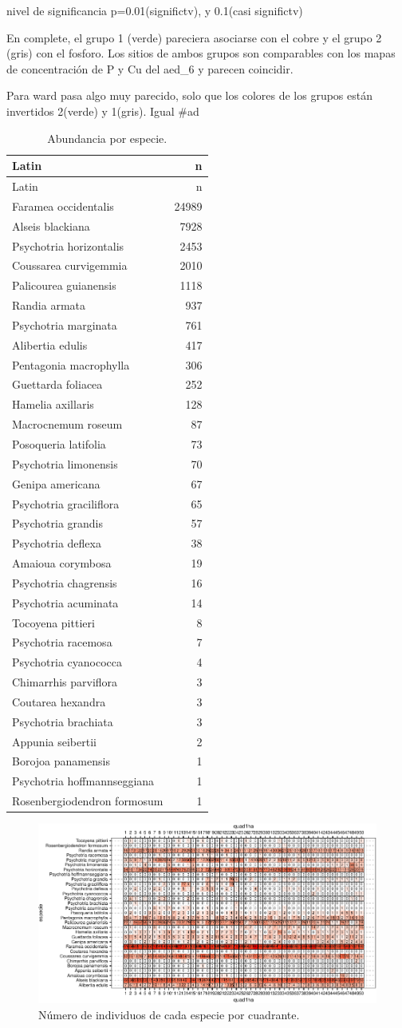 \documentclass[11pt,]{article}
\begin{document}
nivel de significancia p=0.01(significtv), y 0.1(casi significtv)

En complete, el grupo 1 (verde) pareciera asociarse con el cobre y el
grupo 2 (gris) con el fosforo. Los sitios de ambos grupos son
comparables con los mapas de concentración de P y Cu del aed\_6 y
parecen coincidir.

Para ward pasa algo muy parecido, solo que los colores de los grupos
están invertidos 2(verde) y 1(gris). Igual \#ad

\begin{longtable}[]{@{}lr@{}}
\caption{\label{tab:abun_sp}Abundancia por especie.}\tabularnewline
\toprule
Latin & n\tabularnewline
\midrule
\endfirsthead
\toprule
Latin & n\tabularnewline
\midrule
\endhead
Faramea occidentalis & 24989\tabularnewline
Alseis blackiana & 7928\tabularnewline
Psychotria horizontalis & 2453\tabularnewline
Coussarea curvigemmia & 2010\tabularnewline
Palicourea guianensis & 1118\tabularnewline
Randia armata & 937\tabularnewline
Psychotria marginata & 761\tabularnewline
Alibertia edulis & 417\tabularnewline
Pentagonia macrophylla & 306\tabularnewline
Guettarda foliacea & 252\tabularnewline
Hamelia axillaris & 128\tabularnewline
Macrocnemum roseum & 87\tabularnewline
Posoqueria latifolia & 73\tabularnewline
Psychotria limonensis & 70\tabularnewline
Genipa americana & 67\tabularnewline
Psychotria graciliflora & 65\tabularnewline
Psychotria grandis & 57\tabularnewline
Psychotria deflexa & 38\tabularnewline
Amaioua corymbosa & 19\tabularnewline
Psychotria chagrensis & 16\tabularnewline
Psychotria acuminata & 14\tabularnewline
Tocoyena pittieri & 8\tabularnewline
Psychotria racemosa & 7\tabularnewline
Psychotria cyanococca & 4\tabularnewline
Chimarrhis parviflora & 3\tabularnewline
Coutarea hexandra & 3\tabularnewline
Psychotria brachiata & 3\tabularnewline
Appunia seibertii & 2\tabularnewline
Borojoa panamensis & 1\tabularnewline
Psychotria hoffmannseggiana & 1\tabularnewline
Rosenbergiodendron formosum & 1\tabularnewline
\bottomrule
\end{longtable}

\begin{figure}
\centering
\includegraphics{manuscrito_files/figure-latex/unnamed-chunk-3-1.pdf}
\caption{\label{fig:abun_sp_q}Número de individuos de cada especie por
cuadrante.}
\end{figure}
\end{document}
